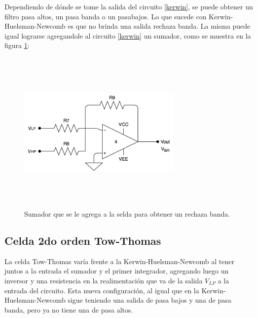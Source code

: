 Dependiendo de d\'onde se tome la salida del circuito \ref{kerwin}, se puede obtener un filtro pasa altos, un pasa banda o un pasabajos. Lo que sucede con Kerwin-Huelsman-Newcomb es que no brinda una salida rechaza banda. La misma puede igual lograrse agregandole al circuito \ref{kerwin} un sumador, como se muestra en la figura \ref{sumador_extra}:

\begin{figure}[H] %
	\centering
	\includegraphics[width=8cm,height=8cm,keepaspectratio]{../EJ4/imagenes/sumador_extra.png}
	\caption{Sumador que se le agrega a la selda para obtener un rechaza banda.}
	\label{sumador_extra}
\end{figure}

\subsection{Celda 2do orden Tow-Thomas}

La celda Tow-Thomas var\'ia frente a la Kerwin-Huelsman-Newcomb al tener juntos a la entrada el sumador y el primer integrador, agregando luego un inversor y una resistencia en la realimentación que va de la salida $V_{LP}$ a la entrada del circuito. Esta nueva configuraci\'on, al igual que en la Kerwin-Huelsman-Newcomb sigue teniendo una salida de pasa bajos y una de pasa banda, pero ya no tiene una de pasa altos. 

